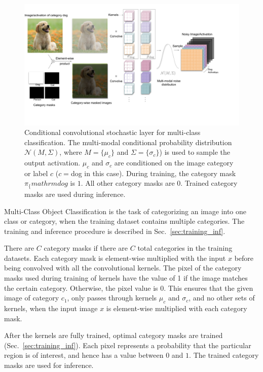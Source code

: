 \documentclass[12pt, letterpaper]{article}
\begin{document}
\begin{figure}[h!]
    \centering
    \includegraphics[width=\textwidth, trim={0cm 2cm 2.4cm 0.5cm}, clip]{Classification Conditional noise layer.pdf}
    \caption{Conditional convolutional stochastic layer for multi-class classification. The multi-modal conditional probability distribution $\mathcal{N}(M, \Sigma)$, where $M=\{\mu_c\}$ and $\Sigma=\{\sigma_c\}$) is used to sample the output activation. $\mu_c$ and $\sigma_c$ are conditioned on the image category or label $c$ ($c=$dog in this case). During training, the category mask $\pi_\{mathrm{dog}$ is $1$. All other category masks are $0$. Trained category masks are used during inference.}
    \label{fig:classification}
\end{figure}
Multi-Class Object Classification is the task of categorizing an image into one class or category, when the training dataset contains multiple categories. The training and inference procedure is described in Sec.~\ref{sec:training_inf}.

There are $C$ category masks if there are $C$ total categories in the training datasets. Each category mask is element-wise multiplied with the input $x$ before being convolved with all the convolutional kernels. 
The pixel of the category masks used during training of kernels have the value of 1 if the image matches the certain category. Otherwise, the pixel value is 0. This ensures that the given image of category $c_1$, only passes through kernels $\mu_c$ and $\sigma_c$, and no other sets of kernels, when the input image $x$ is element-wise multiplied with each category mask.

After the kernels are fully trained, optimal category masks are trained (Sec.~\ref{sec:training_inf}). Each pixel represents a probability that the particular region is of interest, and hence has a value between $0$ and $1$. The trained category masks are used for inference. 
\end{document}
